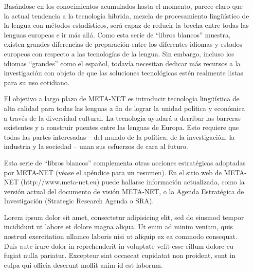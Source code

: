 \begin{multicols}{2}
  Basándose en los conocimientos acumulados hasta el momento, parece claro que la actual tendencia a la tecnología híbrida, mezcla de procesamiento lingüístico de la lengua con métodos estadísticos, será capaz de reducir la brecha entre todas las lenguas europeas e ir más allá. Como esta serie de “libros blancos” muestra, existen grandes diferencias de preparación entre los diferentes idiomas y estados europeos con respecto a las tecnologías de la lengua. Sin embargo, incluso los idiomas “grandes” como el español, todavía necesitan dedicar más recursos a la investigación con objeto de que las soluciones tecnológicas estén realmente listas para su uso cotidiano. 

  El objetivo a largo plazo de META-NET es introducir tecnología lingüística de alta calidad para todas las lenguas a fin de lograr la unidad política y económica a través de la diversidad cultural. La tecnología ayudará a derribar las barreras existentes y a construir puentes entre las lenguas de Europa. Esto requiere que todas las partes interesadas -- del mundo de la política, de la investigación, la industria y la sociedad --  unan sus esfuerzos de cara al futuro.
  
  
  Esta serie de “libros blancos” complementa otras acciones estratégicas adoptadas por META-NET (véase el apéndice para un resumen). En el sitio web de META-NET  (http://www.meta-net.eu) puede hallarse información actualizada, como la versión actual del documento de visión META-NET, o la Agenda Estratégica de Investigación (Strategic Research Agenda o SRA).
  
\end{multicols}

\clearpage



Lorem ipsum dolor sit amet, consectetur adipisicing elit, sed do eiusmod tempor incididunt ut labore et dolore magna aliqua. Ut enim ad minim veniam, quis nostrud exercitation ullamco laboris nisi ut aliquip ex ea commodo consequat. Duis aute irure dolor in reprehenderit in voluptate velit esse cillum dolore eu fugiat nulla pariatur. Excepteur sint occaecat cupidatat non proident, sunt in culpa qui officia deserunt mollit anim id est laborum.